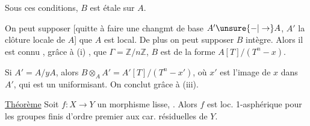 
Sous ces conditions, $B$ est étale sur $A$.

On peut supposer [quitte à faire une
 changmt de base $A'\unsure{-|\to} A$, $A'$ la
clôture  locale de $A$] que $A$ est
 local.  De plus
on peut supposer $B$ intègre. Alors il
est connu , grâce à (i) , que
$\Gamma=\mathbb Z/n\mathbb Z$, $B$ est de la forme $A[T]/(T^n-x)$.


Si $A'=A/yA$, alors $B\otimes_A A'=A'[T]/(T^n-x')$,
où $x'$ est l'image de $x$ dans $A'$, qui est un
uniformisant. On conclut 
grâce à (iii).


 \uline{Théorème} \quad Soit 
$f:X\longrightarrow Y$ un morphisme lisse,
. Alors $f$ est loc.
1-asphérique pour les groupes finis
d'ordre premier aux car. résiduelles
de $Y$.

